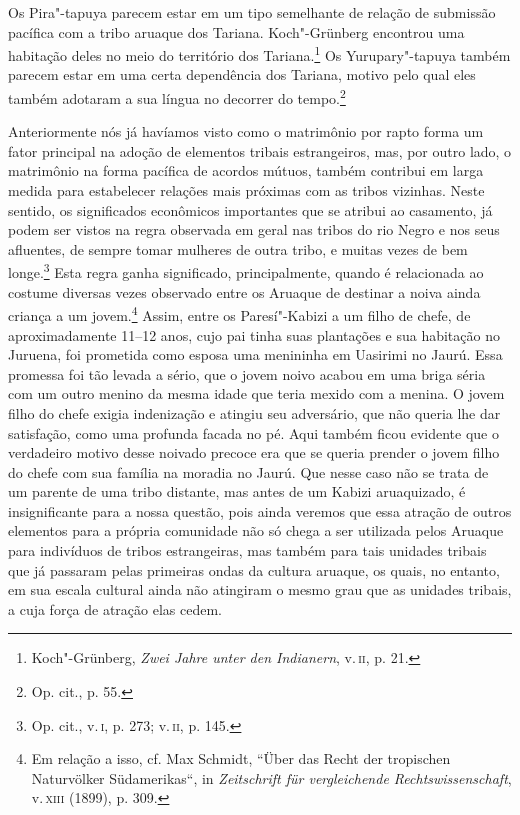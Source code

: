 Os Pira"-tapuya parecem estar em um tipo semelhante de relação de
submissão pacífica com a tribo aruaque dos Tariana. Koch"-Grünberg
encontrou uma habitação deles no meio do território dos
Tariana.\footnote{Koch"-Grünberg, \emph{Zwei Jahre unter den Indianern},
  v.\,\textsc{ii}, p. 21.} Os Yurupary"-tapuya também parecem estar em uma certa
dependência dos Tariana, motivo pelo qual eles também adotaram a sua
língua no decorrer do tempo.\footnote{Op. cit., p. 55.}

Anteriormente nós já havíamos visto como o matrimônio por rapto forma um
fator principal na adoção de elementos tribais estrangeiros, mas, por
outro lado, o matrimônio na forma pacífica de acordos mútuos, também
contribui em larga medida para estabelecer relações mais próximas com as
tribos vizinhas. Neste sentido, os significados econômicos importantes
que se atribui ao casamento, já podem ser vistos na regra observada em
geral nas tribos do rio Negro e nos seus afluentes, de sempre tomar
mulheres de outra tribo, e muitas vezes de bem longe.\footnote{Op. cit.,
  v.\,\textsc{i}, p. 273; v.\,\textsc{ii}, p. 145.} Esta regra ganha significado,
principalmente, quando é relacionada ao costume diversas vezes observado
entre os Aruaque de destinar a noiva ainda criança a um jovem.\footnote{Em
  relação a isso, cf. Max Schmidt, ``Über das Recht der tropischen
  Naturvölker Südamerikas``, in \emph{Zeitschrift für vergleichende
  Rechtswissenschaft}, v.\,\textsc{xiii} (1899), p. 309.} Assim, entre os
Paresí"-Kabizi a um filho de chefe, de aproximadamente 11--12 anos, cujo
pai tinha suas plantações e sua habitação no Juruena, foi prometida
como esposa uma menininha em Uasirimi no Jaurú. Essa promessa foi tão
levada a sério, que o jovem noivo acabou em uma briga séria com um outro
menino da mesma idade que teria mexido com a menina. O jovem filho do
chefe exigia indenização e atingiu seu adversário, que não queria lhe
dar satisfação, como uma profunda facada no pé. Aqui também ficou
evidente que o verdadeiro motivo desse noivado precoce era que se queria
prender o jovem filho do chefe com sua família na moradia no Jaurú. Que
nesse caso não se trata de um parente de uma tribo distante, mas antes
de um Kabizi aruaquizado, é insignificante para a nossa questão, pois
ainda veremos que essa atração de outros elementos para a própria
comunidade não só chega a ser utilizada pelos Aruaque para indivíduos de
tribos estrangeiras, mas também para tais unidades tribais que já
passaram pelas primeiras ondas da cultura aruaque, os quais, no
entanto, em sua escala cultural ainda não atingiram o mesmo grau que as
unidades tribais, a cuja força de atração elas cedem.


